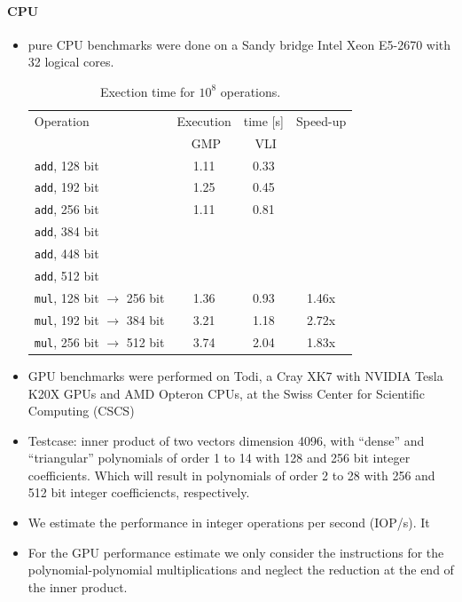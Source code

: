\documentclass[oribibl]{llncs2e/llncs}
\begin{document}
\paragraph{CPU}
\begin{itemize}
\item pure CPU benchmarks were done on a Sandy bridge Intel Xeon E5-2670 with 32 logical cores.
\begin{table}
\begin{center}
\begin{tabular}{l|cc|c}
 Operation & Execution & time [s] & Speed-up\\
   & \, GMP\,  & \, VLI\,  & \\
 \hline
\verb|add|, 128 bit & 1.11 & 0.33 & \\
\verb|add|, 192 bit & 1.25 & 0.45 & \\
\verb|add|, 256 bit & 1.11 & 0.81 & \\
\verb|add|, 384 bit & & & \\
\verb|add|, 448 bit & & & \\
\verb|add|, 512 bit & & & \\
\hline
\verb|mul|, 128 bit $\rightarrow$ 256 bit & 1.36 & 0.93 & 1.46x \\
\verb|mul|, 192 bit $\rightarrow$ 384 bit & 3.21 & 1.18 & 2.72x \\
\verb|mul|, 256 bit $\rightarrow$ 512 bit & 3.74 & 2.04 & 1.83x \\ 
\end{tabular}
\caption{Exection time for $10^8$ operations.}
\end{center}
\end{table}
\item GPU benchmarks were performed on Todi, a Cray XK7 with NVIDIA Tesla K20X GPUs and AMD Opteron CPUs, at the Swiss Center for Scientific Computing (CSCS)
\item Testcase: inner product of two vectors dimension 4096, with ``dense'' and
``triangular'' polynomials of order 1 to 14 with 128 and 256 bit integer
coefficients. Which will result in polynomials of order 2 to 28 with 256 and 512 bit integer coefficiencts, respectively.
\item We estimate the performance in integer operations per second (IOP/s).
It
\item For the GPU performance estimate we only consider the instructions for the polynomial-polynomial multiplications and neglect the reduction at the end of the inner product.


\end{itemize}
\end{document}

